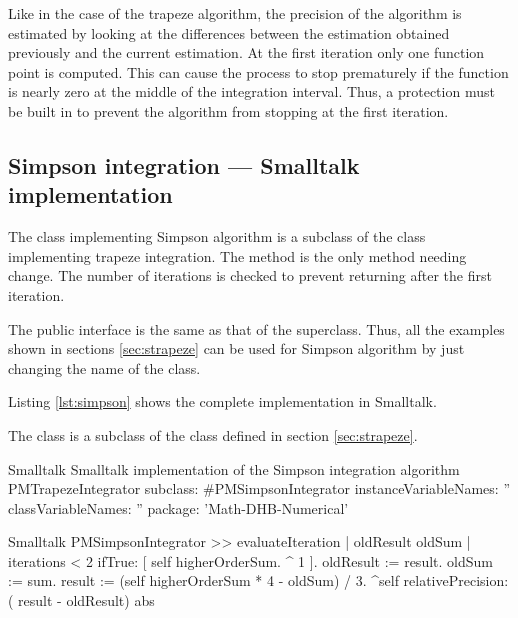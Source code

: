 Like in the case of the trapeze algorithm, the precision of the
algorithm is estimated by looking at the differences between the
estimation obtained previously and the current estimation. At the
first iteration only one function point is computed. This can
cause the process to stop prematurely if the function is nearly
zero at the middle of the integration interval. Thus, a protection
must be built in to prevent the algorithm from stopping at the
first iteration.

\subsection{Simpson integration --- Smalltalk implementation}
\label{sec:sSimpson}
The class implementing Simpson algorithm is a subclass of the
class implementing trapeze integration.
The method  is the only method needing change.
The number of iterations is checked to prevent returning after the first
iteration.

The public interface is the same as that of the superclass.
Thus, all the examples shown in sections \ref{sec:strapeze} can be used for Simpson
algorithm by just changing the name of the class.

Listing \ref{lst:simpson} shows the complete implementation in Smalltalk.

The class  is a subclass of the class
 defined in section \ref{sec:strapeze}.

\begin{listing}[label=lst:simpson]{Smalltalk}
{Smalltalk implementation of the Simpson integration algorithm}
PMTrapezeIntegrator subclass: #PMSimpsonIntegrator
   instanceVariableNames: ''
   classVariableNames: ''
   package: 'Math-DHB-Numerical'
\end{listing}

\begin{displaycode}{Smalltalk}
PMSimpsonIntegrator >> evaluateIteration
| oldResult oldSum |
    iterations < 2
        ifTrue: [ self higherOrderSum.
                  ^ 1 ].
    oldResult := result.
    oldSum := sum.
    result := (self higherOrderSum * 4 - oldSum) / 3.
    ^self relativePrecision: ( result - oldResult) abs
\end{displaycode}

